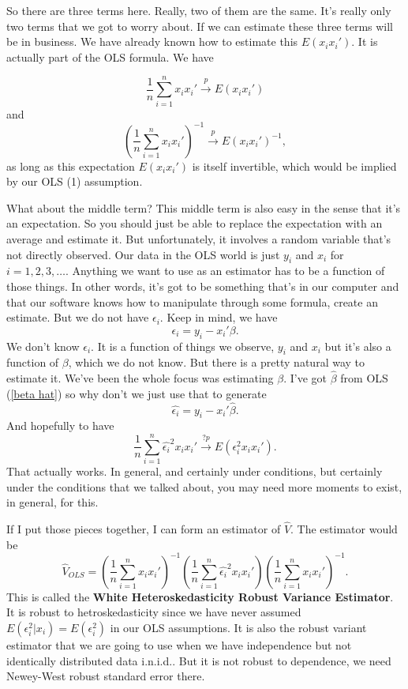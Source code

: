\documentclass[11pt,a4paper]{amsart}
\theoremstyle{plain}
\theoremstyle{definition}
\begin{document}
		 So there are three terms here. Really, two of them are the same. It's really only two terms that we got to worry about. If we can estimate these three terms will be in business. We have already known how to estimate this $E(x_{i}x_{i}')$. It is actually part of the OLS formula. We have \par 
		 \[	\frac{1}{n} \sum_{i=1}^{n} x_{i}x_{i}' \stackrel{p}{\longrightarrow} E(x_{i}x_{i}')	\]
		 and 
		 \[	(\frac{1}{n} \sum_{i=1}^{n} x_{i}x_{i}')^{-1} \stackrel{p}{\longrightarrow} E(x_{i}x_{i}')^{-1},	\]
		  as long as this expectation $E(x_{i}x_{i}')$ is itself invertible, which would be implied by our OLS (1) assumption.\par 
		   What about the middle term? This middle term is also easy in the sense that it's an expectation. So you should just be able to replace the expectation with an average and estimate it. But unfortunately, it involves a random variable that's not directly observed. Our data in the OLS world is just $y_{i}$ and $x_{i}$ for $i = 1,2,3, \dots$.  Anything we want to use as an estimator has to be a function of those things. In other words, it's got to be something that's in our computer and that our software knows how to manipulate through some formula, create an estimate. But we do not have $\epsilon_{i}$. Keep in mind, we have 
		   \[	\epsilon_{i} = y_{i} - x_{i}' \beta.	\]
		   We don't know $\epsilon_{i}$. It is a function of things we observe, $y_{i}$ and $x_{i}$ but it's also a function of $\beta$, which we do not know. But there is a pretty natural way to estimate it. We've been the whole focus was estimating $\beta$. I've got $\hat{\beta}$ from OLS (\ref{beta hat}) so why don't we just use that to generate
		   \[	\hat{\epsilon_{i}} = y_{i} - x_{i}' \hat{\beta}.	\]
		  	And hopefully to have 
		  	\[	\frac{1}{n}\sum_{i=1}^{n} \hat{\epsilon_{i}}^{2} x_{i}x_{i}' \stackrel{? p}{\longrightarrow} E(\epsilon_{i}^{2}x_{i}x_{i}').	\]
		   That actually works. In general, and certainly under conditions, but certainly under the conditions that we talked about, you may need more moments to exist, in general, for this.\par 
		   If I put those pieces together, I can form an estimator of $\hat{V}$. The estimator would be 
		   \[	\hat{V}_{OLS} = (\frac{1}{n}\sum_{i=1}^{n}x_{i}x_{i}')^{-1} (\frac{1}{n}\sum_{i=1}^{n} \hat{\epsilon_{i}}^{2} x_{i}x_{i}') (\frac{1}{n}\sum_{i=1}^{n}x_{i}x_{i}')^{-1}.	\]
		   This is called the \textbf{White Heteroskedasticity Robust Variance Estimator}. It is robust to hetroskedasticity since we have never assumed $E(\epsilon_{i}^{2}|x_{i}) = E(\epsilon_{i}^{2})$ in our OLS assumptions. It is also the robust variant estimator that we are going to use when we have independence but not identically distributed data i.n.i.d.. But it is not robust to dependence, we need Newey-West robust standard error there.\par 
\end{document}
